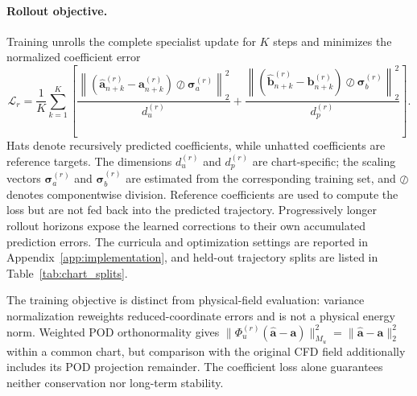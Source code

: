 \paragraph{Rollout objective.}
Training unrolls the complete specialist update for $K$ steps and
minimizes the normalized coefficient error
\begin{equation}
  \mathcal L_r=\frac{1}{K}\sum_{k=1}^{K}\left[
  \frac{\left\|(\widehat{\bm a}_{n+k}^{(r)}-\bm a_{n+k}^{(r)})
  \oslash\bm\sigma_a^{(r)}\right\|_2^2}{d_u^{(r)}}
  +\frac{\left\|(\widehat{\bm b}_{n+k}^{(r)}-\bm b_{n+k}^{(r)})
  \oslash\bm\sigma_b^{(r)}\right\|_2^2}{d_p^{(r)}}\right].
  \label{eq:main_rollout_loss}
\end{equation}
Hats denote recursively predicted coefficients, while unhatted
coefficients are reference targets. The dimensions $d_u^{(r)}$ and
$d_p^{(r)}$ are chart-specific; the scaling vectors
$\bm\sigma_a^{(r)}$ and $\bm\sigma_b^{(r)}$ are estimated from the
corresponding training set, and $\oslash$ denotes componentwise
division. Reference coefficients are used to compute the loss but
are not fed back into the predicted trajectory. Progressively longer
rollout horizons expose the learned corrections to their own
accumulated prediction errors. The curricula and optimization
settings are reported in Appendix~\ref{app:implementation}, and
held-out trajectory splits are listed in Table~\ref{tab:chart_splits}.

The training objective is distinct from physical-field evaluation:
variance normalization reweights reduced-coordinate errors and is
not a physical energy norm. Weighted POD orthonormality gives
$\|\Phi_u^{(r)}(\widehat{\bm a}-\bm a)\|_{M_u}^2
=\|\widehat{\bm a}-\bm a\|_2^2$ within a common chart, but comparison
with the original CFD field additionally includes its POD projection
remainder. The coefficient loss alone guarantees neither
conservation nor long-term stability.
